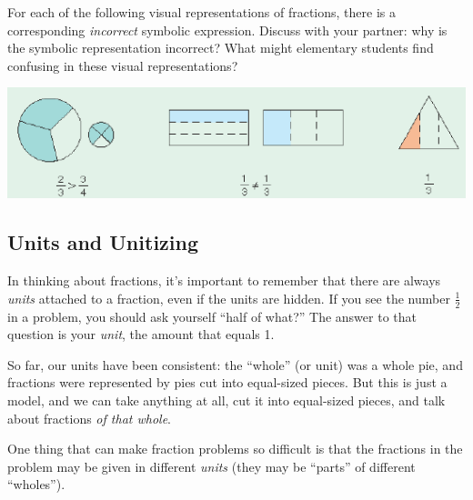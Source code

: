 \begin{thinkpair*}
For each of the following visual representations of fractions, there is a corresponding \emph{incorrect} symbolic expression.   Discuss with your partner: why is the symbolic representation incorrect?  What might elementary students find confusing in these visual representations?

\begin{center}
\includegraphics[height=3 cm]{fractionreps}
\end{center}


\end{thinkpair*}




\subsection{Units and Unitizing}
In thinking about fractions, it's important to remember that there are always \emph{units} attached to a fraction, even if the units are hidden.  If you see the number $\frac 1 2$ in a problem, you should ask yourself ``half of what?''  The answer to that question is your \emph{unit}, the amount that equals 1.


So far, our units have been consistent: the ``whole'' (or unit) was a whole pie, and fractions were represented by pies cut into equal-sized pieces.  But this is just a model, and we can take anything at all, cut it into equal-sized pieces, and talk about fractions \emph{of that whole}.

One thing that can make fraction problems  so difficult is that the fractions in the problem may be given in different \emph{units} (they may be ``parts'' of different ``wholes'').  




